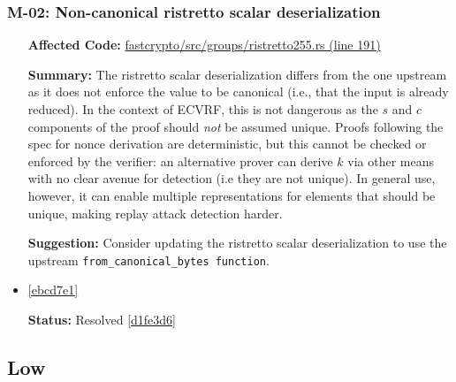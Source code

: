 \subsubsection*{M-02: Non-canonical ristretto scalar deserialization}
\begin{itemize}[align=left]
\item[\textbf{Affected Code:}] \href{https://github.com/MystenLabs/fastcrypto/blob/963205c6d0538fe548b8b10037cf87a53af6f424/fastcrypto/src/groups/ristretto255.rs#L191}{fastcrypto/src/groups/ristretto255.rs (line 191)}
\item[\textbf{Summary:}] The ristretto scalar deserialization differs from the one upstream as it does not enforce the value to be canonical (i.e., that the input is already reduced). In the context of ECVRF, this is not dangerous as the $s$ and $c$ components of the proof should \emph{not} be assumed unique. Proofs following the spec for nonce derivation are deterministic, but this cannot be checked or enforced by the verifier: an alternative prover can derive $k$ via other means with no clear avenue for detection (i.e they are not unique). In general use, however, it can enable multiple representations for elements that should be unique, making replay attack detection harder.
\item[\textbf{Suggestion:}] Consider updating the ristretto scalar deserialization to use the upstream \lstinline{from_canonical_bytes function}.
\item[\textbf{Suggested Fix:}] \href{https://github.com/MystenLabs/fastcrypto/pull/543/commits/ebcd7e1c8e6f0bbf48667f995017151a20289886}{[ebcd7e1]}
\item[\textbf{Status:}] Resolved \href{https://github.com/MystenLabs/fastcrypto/commit/d1fe3d670e2e4b756813b3c8cfc09711ede24b68}{[d1fe3d6]}
\end{itemize}

\subsection{Low}
